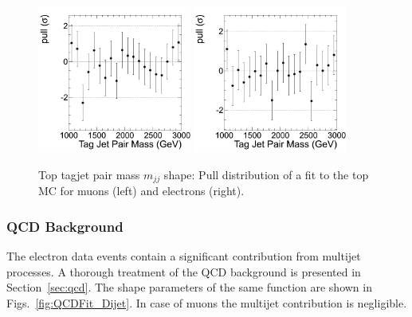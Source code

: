\begin{figure}
\begin{center}
\includegraphics[width=0.45\textwidth]{figs/wpj/EWKW2jetstagjetmjj_top_muon_Model_12_Validate_pull.png}
\includegraphics[width=0.45\textwidth]{figs/wpj/EWKW2jetstagjetmjj_top_electron_Model_12_Validate_pull.png}
\end{center}
\caption{\label{fig:topFit} Top tagjet pair mass  $m_{jj}$ shape: Pull distribution of a fit to the top MC for muons (left) and electrons (right).}
\label{fig:topFit_Dijet_Pull}
\end{figure}

\subsubsection{QCD Background}
The electron data events contain a significant contribution from multijet processes. 
A thorough treatment of the QCD background is presented in Section~\ref{sec:qcd}. The shape parameters of the same function are shown in Figs.~\ref{fig:QCDFit_Dijet}. In case of muons the multijet contribution is negligible.

